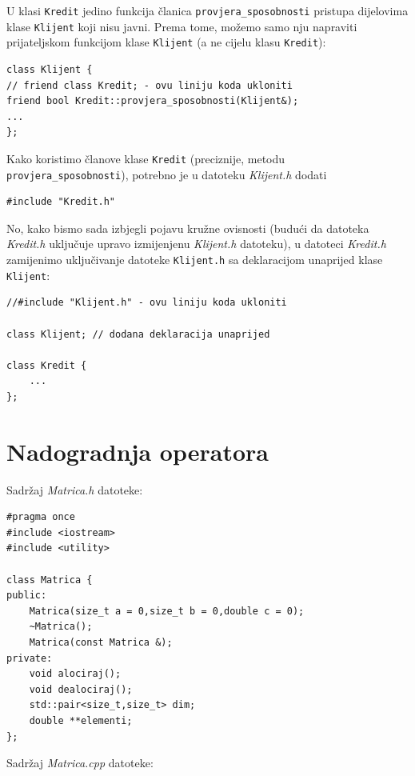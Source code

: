 \begin{rjesenje}
    U klasi \texttt{Kredit} jedino funkcija članica
    \texttt{provjera\_sposobnosti} pristupa dijelovima klase \texttt{Klijent}
    koji nisu javni.
    Prema tome, možemo samo nju napraviti prijateljskom funkcijom klase \texttt{Klijent} (a ne cijelu klasu \texttt{Kredit}):
\begin{verbatim}
class Klijent {
// friend class Kredit; - ovu liniju koda ukloniti
friend bool Kredit::provjera_sposobnosti(Klijent&);
...
};
\end{verbatim}
Kako koristimo članove klase \texttt{Kredit}
(preciznije, metodu \texttt{provjera\_sposobnosti}),
potrebno je u datoteku \textit{Klijent.h} dodati
\begin{verbatim}
#include "Kredit.h"
\end{verbatim}
No, kako bismo sada izbjegli pojavu kružne ovisnosti
(budući da datoteka \textit{Kredit.h} uključuje upravo izmijenjenu
\textit{Klijent.h} datoteku),
u datoteci \textit{Kredit.h} zamijenimo
uključivanje datoteke \texttt{Klijent.h} sa deklaracijom unaprijed klase \texttt{Klijent}:
\begin{verbatim}
//#include "Klijent.h" - ovu liniju koda ukloniti

class Klijent; // dodana deklaracija unaprijed

class Kredit {
    ...
};
\end{verbatim}
\end{rjesenje}



\section{Nadogradnja operatora}


Sadržaj \textit{Matrica.h} datoteke:

\begin{verbatim}
#pragma once
#include <iostream>
#include <utility>

class Matrica {
public:
	Matrica(size_t a = 0,size_t b = 0,double c = 0);
	~Matrica();
	Matrica(const Matrica &);
private:
	void alociraj();
	void dealociraj();
	std::pair<size_t,size_t> dim;
	double **elementi;
};
\end{verbatim}

Sadržaj \textit{Matrica.cpp} datoteke:

